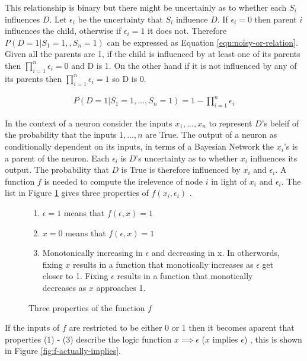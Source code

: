 This relationship is binary but there might be uncertainly as to whether each $S_i$ influences $D$. Let $\epsilon_i$ be the uncertainty that $S_i$ influence $D$. If $\epsilon_i = 0$ then parent $i$ influences the child, otherwise if $\epsilon_i = 1$ it does not. Therefore $P(D = 1| S_1 = 1, , S_n = 1)$ can be expressed as Equation \ref{equ:noisy-or-relation}. Given all the parents are 1, if the child is influenced by at least one of its parents then $\prod^n_{i=1} \epsilon_i = 0$ and D is 1. On the other hand if it is not influenced by any of its parents then $\prod^n_{i=1} \epsilon_i = 1$ so D is 0.

\begin{align}
P(D = 1 | S_1 = 1, ..., S_n = 1) = 1 - \prod^n_{i=1} \epsilon_i
\label{equ:noisy-or-relation}
\end{align}

In the context of a neuron consider the inputs $x_1, ..., x_n$ to represent $D$'s beleif of the probability that the inputs $1, ..., n$ are True. The output of a neuron as conditionally dependent on its inputs, in terms of a Bayesian Network the $x_i$'s is a parent of the neuron. Each $\epsilon_i$ is $D$'s uncertainty as to whether $x_i$ influences its output. The probability that $D$ is True is therefore influenced by $x_i$ and $\epsilon_i$. A function $f$ is needed to compute the irelevence of node $i$ in light of $x_i$ and $\epsilon_i$. The list in Figure \ref{fig:irelevence-function-cond} gives three properties of $f(x_i, \epsilon_i)$ \cite{LearningLogicalActivations}. \\

\begin{figure}[H]
\begin{enumerate}
	\item $\epsilon = 1$ means that $f(\epsilon, x) = 1$
	\item $x = 0$ means that $f(\epsilon, x) = 1$
	\item Monotonically increasing in $\epsilon$ and decreasing in x. In otherwords, fixing $x$ results in a function that monotically increases as $\epsilon$ get closer to 1. Fixing $\epsilon$ results in a function that monotically decreases as $x$ approaches 1.
\end{enumerate}
\caption{Three properties of the function $f$}
\label{fig:irelevence-function-cond}
\end{figure}

If the inputs of $f$ are restricted to be either 0 or 1 then it becomes aparent that properties (1) - (3) describe the logic function $x \implies \epsilon$ ($x$ implies $\epsilon$) , this is shown in Figure \ref{fig:f-actually-implies}. 

